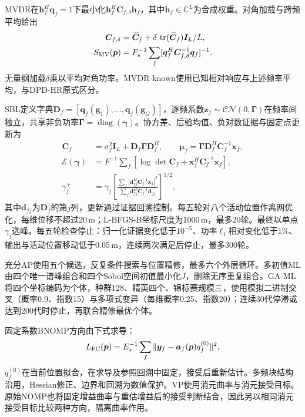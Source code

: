 \documentclass[a4paper,fleqn]{cas-sc}
\newcommand{\C}{\mathbb C}
\newcommand{\tr}{\operatorname{tr}}
\begin{document}
MVDR在$\bm h_f^H\bm q_f=1$下最小化$\bm h_f^H\bm C_{f,\delta}\bm h_f$，其中$\bm h_f\in\C^L$为合成权重\cite{Capon1969}。对角加载与跨频平均给出
\begin{equation}
\begin{split}
\bm C_{f,\delta}&=\widehat{\bm C}_f+
\delta\,\tr(\widehat{\bm C}_f)\bm I_L/L,\\
S_{\rm MV}(\bm p)&=F_s^{-1}\sum_f
[\bm q_f^H\bm C_{f,\delta}^{-1}\bm q_f]^{-1}.
\end{split}
\end{equation}
无量纲加载$\delta$乘以平均对角功率。MVDR-known使用已知相对响应与上述频率平均，与DPD-HR原式区分\cite{TirerWeiss2016}。

SBL定义字典$\bm D_f=[\bm q_f(\bm g_1),\ldots,\bm q_f(\bm g_G)]$，逐频系数$\bm z_f\sim\mathcal{CN}(0,\bm\Gamma)$在频率间独立，共享非负功率$\bm\Gamma=\operatorname{diag}(\bm\gamma)$\cite{Nannuru2019}。协方差、后验均值、负对数证据与固定点更新为
\begin{align}
\bm C_f&=\sigma_f^2\bm I_L+\bm D_f\bm\Gamma\bm D_f^H,\qquad
\bm\mu_f=\bm\Gamma\bm D_f^H\bm C_f^{-1}\bm x_f,\\
\mathcal E(\bm\gamma)&=F^{-1}\sum_f
[\log\det\bm C_f+\bm x_f^H\bm C_f^{-1}\bm x_f],\\
\gamma_j^+&=\gamma_j\left[
\frac{\sum_f|\bm d_{fj}^H\bm C_f^{-1}\bm x_f|^2}
{\sum_f\bm d_{fj}^H\bm C_f^{-1}\bm d_{fj}}
\right]^{1/2},
\end{align}
其中$\bm d_{fj}$为$\bm D_f$的第$j$列，更新通过证据回溯控制。每五轮对八个活动位置作离网优化，每维位移不超过20\,m；L-BFGS-B坐标尺度为1000\,m，最多20轮。最终以单点$\gamma_j$选峰。每五轮检查停止：归一化证据变化低于$10^{-5}$、功率$\ell_1$相对变化低于1\%、输出与活动位置移动低于0.05\,m，连续两次满足后停止，最多300轮。

充分AP使用五个候选，反复条件搜索与位置精修，最多六个外层循环。多初值ML由四个唯一谱峰组合和四个Sobol空间初值最小化$J$，删除无序重复组合。GA-ML将四个坐标编码为个体，种群128、精英四个、锦标赛规模三，使用模拟二进制交叉（概率0.9、指数15）与多项式变异（每维概率0.25、指数20）\cite{DebAgrawal1995}；连续30代停滞或达到200代时停止，再联合精修最优个体。

固定系数BNOMP方向由下式求导：
\begin{equation}
L_{\rm FC}(\bm p)=E_x^{-1}\sum_f
\|\bm y_f-\bm a_f(\bm p)q_f^{(0)}\|^2,
\label{en:fixedcoef}
\end{equation}
$q_f^{(0)}$在当前位置拟合，在求导及参照回溯中固定，接受后重新估计。多频块结构沿用\cite{Yang2022}，Hessian修正、边界和回溯为数值保护。VP使用消元曲率与消元接受目标。原始NOMP也将固定增益曲率与重估增益后的接受判断结合\cite{Mamandipoor2016}，因此另以相同消元接受目标比较两种方向，隔离曲率作用。
\end{document}
